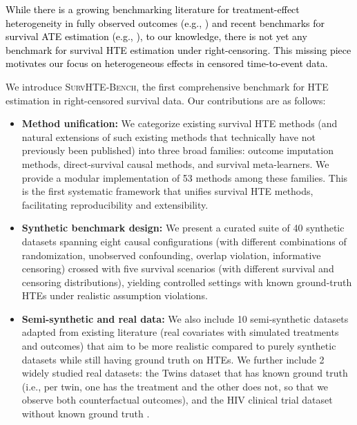 \documentclass{article} %
\newcommand{\rebuttal}[1]{\textcolor{black}{#1}}
\begin{document}
\rebuttal{
While there is a growing benchmarking literature for treatment-effect heterogeneity in fully observed outcomes (e.g., \cite{NEURIPS2022_benchmark, Shimoni2018Benchmarking, Kapkic2024causalbench}) and recent benchmarks for survival ATE estimation (e.g., \cite{voinot2025causal}), to our knowledge, there is not yet any benchmark for survival HTE estimation under right-censoring. This missing piece motivates our focus on heterogeneous effects in censored time-to-event data.
}


We introduce \textsc{SurvHTE‐Bench}, the first comprehensive benchmark for HTE estimation in right-censored survival data. Our contributions are as follows:
\begin{itemize}[leftmargin=*,itemsep=0pt,parsep=0pt,partopsep=0pt,topsep=-3pt]
    \item \textbf{Method unification:} We categorize existing survival HTE methods (and natural extensions of such existing methods that technically have not previously been published) into three broad families: outcome imputation methods, direct-survival causal methods, and survival meta-learners. We provide a modular implementation of 53 methods among these families. This is the first systematic framework that unifies survival HTE methods, facilitating reproducibility and extensibility.  
    \item \textbf{Synthetic benchmark design:} We present a curated suite of 40 synthetic datasets spanning eight causal configurations (with different combinations of randomization, unobserved confounding, overlap violation, informative censoring) crossed with five survival scenarios (with different survival and censoring distributions), yielding controlled settings with known ground-truth HTEs under realistic assumption violations.
    \item \textbf{Semi-synthetic and real data:} We also include 10 semi-synthetic datasets adapted from existing literature (real covariates with simulated treatments and outcomes) that aim to be more realistic compared to purely synthetic datasets while still having ground truth on HTEs. We further include 2 widely studied real datasets: the Twins dataset that has known ground truth \citep{almond2005the} (i.e., per twin, one has the treatment and the other does not, so that we observe both counterfactual outcomes), and the HIV clinical trial dataset without known ground truth \citep{hammer1996atrial}.

\end{itemize}
\end{document}
